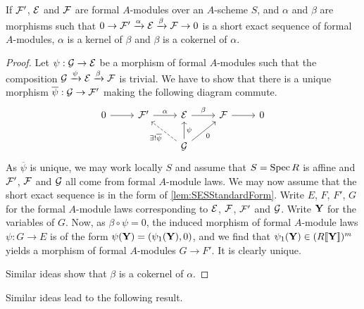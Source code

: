 \documentclass[../main.tex]{subfiles}
\begin{document}
\begin{lem}
  If $\mathcal{F}'$, $\mathcal{E}$ and $\mathcal{F}$ are formal $A$-modules over an $A$-scheme $S$,
  and $\alpha$ and $\beta$ are morphisms such that 
  $0 \to \mathcal{F}' \xrightarrow{\alpha} \mathcal{E} \xrightarrow{\beta} \mathcal{F} \to 0$ 
  is a short exact sequence of formal $A$-modules, $\alpha$ is a kernel of
  $\beta$ and $\beta$ is a cokernel of $\alpha$. 
\begin{proof}
  Let $\psi: \mathcal{G} \to \mathcal{E}$ be a morphism of formal $A$-modules such that
  the composition $\mathcal{G} \xrightarrow{\psi} \mathcal{E} \xrightarrow{\beta} \mathcal{F}$ is trivial. 
  We have to show that there is a unique morphism $\overline \psi: \mathcal{G} \to 
  \mathcal{F}'$ making the following diagram commute.
  \begin{equation*}
    \begin{tikzcd}[ampersand replacement=\&]
    	0 \& {\cF'} \& \cE \& \cF \& 0 \\
    	\&\& \cG
    	\arrow[from=1-1, to=1-2]
    	\arrow["\alpha", from=1-2, to=1-3]
    	\arrow["\beta", from=1-3, to=1-4]
    	\arrow[from=1-4, to=1-5]
    	\arrow["{\exists!\overline \psi}", dashed, from=2-3, to=1-2]
    	\arrow["{\psi}"', from=2-3, to=1-3]
    	\arrow["0"', from=2-3, to=1-4]
    \end{tikzcd}
  \end{equation*}
  As $\overline \psi$ is unique, we may work locally $S$ and assume that $S =
  \operatorname{Spec} R$ is affine and 
  $\mathcal{F}'$, $\mathcal{F}$ and $\mathcal{G}$ all come from formal $A$-module laws. We may
  now assume that the short exact sequence is in the form of
  \cref{lem:SESStandardForm}. Write $E$, $F$, $F'$, $G$ for the 
  formal $A$-module laws corresponding to $\mathcal{E}$, $\mathcal{F}$, $\mathcal{F}'$ and 
  $\mathcal{G}$. Write $\mathbf{Y}$ for the variables of $G$. Now, as 
  $\beta \circ \psi = 0$, the induced morphism of
  formal $A$-module laws $\psi: G \to E$ is of the form $\psi(\mathbf{Y}) =
  (\psi_1(\mathbf{Y}), 0)$, and we find that $\psi_1(\mathbf{Y}) \in (R\llbracket \mathbf{Y} \rrbracket)^m$
  yields a morphism of formal $A$-modules $G \to F'$. It is clearly unique. 
  
  Similar ideas show that $\beta$ is a cokernel of $\alpha$. 
\end{proof}

\end{lem}

Similar ideas lead to the following result.
\end{document}
